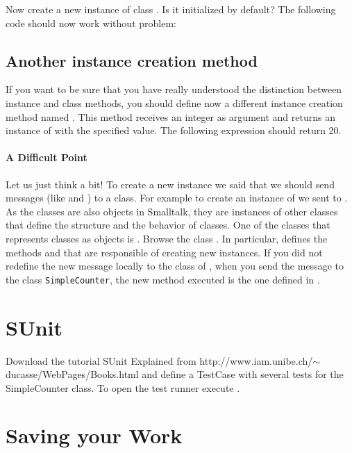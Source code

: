 Now create a new instance of class . Is it
initialized by default? The following code should now work without
problem: 

\subsection*{Another instance creation method}
If you want to be sure that you have really understood the
distinction between instance and class methods, you should define
now a different instance creation method named
. This method receives an integer as argument
and returns an instance of  with the
specified value. The following expression should return 20.


\paragraph{A Difficult Point}
Let us just think a bit! To create a new instance we said that we
should send messages (like  and ) to
a class. For example to create an instance of
 we sent  to
. As the classes are also objects in
Smalltalk, they are instances of other classes that define the
structure and the behavior of classes. One of the classes that
represents classes as objects is . Browse the
class . In particular,  defines
the methods  and  that are
responsible of creating new instances. If you did not redefine the
new message locally to the class of , when
you send the message  to the class
\texttt{SimpleCounter}, the new method executed is the one defined
in .

\section*{SUnit}
Download the tutorial SUnit Explained from http://www.iam.unibe.ch/$\sim$ducasse/\-WebPages\-/Books.html and define a TestCase with several tests for the SimpleCounter class. To open the test runner execute .

\section*{Saving your Work}


\ifx\wholebook\relax\else\fi
